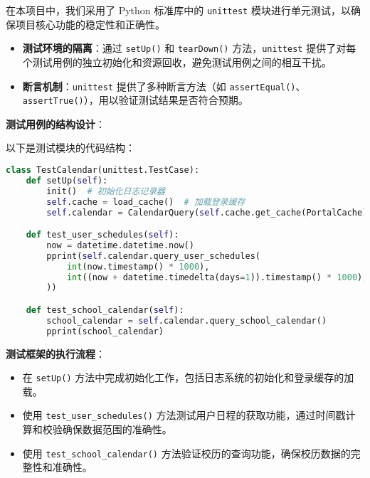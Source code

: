 在本项目中，我们采用了 Python 标准库中的 \texttt{unittest} 模块进行单元测试，以确保项目核心功能的稳定性和正确性。

\begin{itemize}
    \item \textbf{测试环境的隔离}：通过 \texttt{setUp()} 和 \texttt{tearDown()} 方法，\texttt{unittest} 提供了对每个测试用例的独立初始化和资源回收，避免测试用例之间的相互干扰。
    \item \textbf{断言机制}：\texttt{unittest} 提供了多种断言方法（如 \texttt{assertEqual()}、\texttt{assertTrue()}），用以验证测试结果是否符合预期。
\end{itemize}

\textbf{测试用例的结构设计}：

以下是测试模块的代码结构：
\begin{lstlisting}[language=Python]
class TestCalendar(unittest.TestCase):
    def setUp(self):
        init()  # 初始化日志记录器
        self.cache = load_cache()  # 加载登录缓存
        self.calendar = CalendarQuery(self.cache.get_cache(PortalCache))

    def test_user_schedules(self):
        now = datetime.datetime.now()
        pprint(self.calendar.query_user_schedules(
            int(now.timestamp() * 1000),
            int((now + datetime.timedelta(days=1)).timestamp() * 1000),
        ))

    def test_school_calendar(self):
        school_calendar = self.calendar.query_school_calendar()
        pprint(school_calendar)
\end{lstlisting}

\textbf{测试框架的执行流程}：
\begin{itemize}
    \item 在 \texttt{setUp()} 方法中完成初始化工作，包括日志系统的初始化和登录缓存的加载。
    \item 使用 \texttt{test\_user\_schedules()} 方法测试用户日程的获取功能，通过时间戳计算和校验确保数据范围的准确性。
    \item 使用 \texttt{test\_school\_calendar()} 方法验证校历的查询功能，确保校历数据的完整性和准确性。
\end{itemize}
